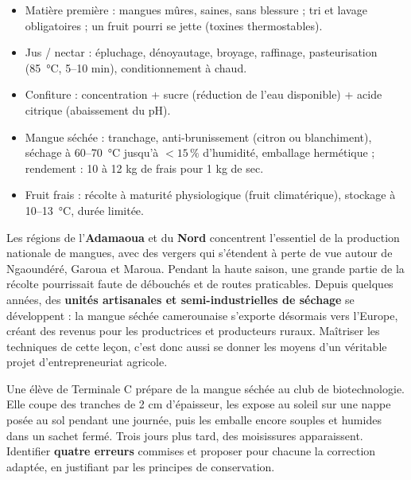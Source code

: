 \documentclass[11pt]{article}
\begin{document}
\begin{aretenir}
\begin{itemize}
\item Matière première : mangues mûres, saines, sans blessure ; tri et lavage obligatoires ; un fruit pourri se jette (toxines thermostables).
\item Jus / nectar : épluchage, dénoyautage, broyage, raffinage, pasteurisation (\SI{85}{\celsius}, 5--10 min), conditionnement à chaud.
\item Confiture : concentration + sucre (réduction de l'eau disponible) + acide citrique (abaissement du pH).
\item Mangue séchée : tranchage, anti-brunissement (citron ou blanchiment), séchage à 60--\SI{70}{\celsius} jusqu'à $< 15\,\%$ d'humidité, emballage hermétique ; rendement : 10 à 12 kg de frais pour 1 kg de sec.
\item Fruit frais : récolte à maturité physiologique (fruit climatérique), stockage à 10--\SI{13}{\celsius}, durée limitée.
\end{itemize}
\end{aretenir}

\begin{savaistu}
Les régions de l'\textbf{Adamaoua} et du \textbf{Nord} concentrent l'essentiel de la production nationale de mangues, avec des vergers qui s'étendent à perte de vue autour de Ngaoundéré, Garoua et Maroua. Pendant la haute saison, une grande partie de la récolte pourrissait faute de débouchés et de routes praticables. Depuis quelques années, des \textbf{unités artisanales et semi-industrielles de séchage} se développent : la mangue séchée camerounaise s'exporte désormais vers l'Europe, créant des revenus pour les productrices et producteurs ruraux. Maîtriser les techniques de cette leçon, c'est donc aussi se donner les moyens d'un véritable projet d'entrepreneuriat agricole.
\end{savaistu}

\begin{exercice}
Une élève de Terminale C prépare de la mangue séchée au club de biotechnologie. Elle coupe des tranches de 2 cm d'épaisseur, les expose au soleil sur une nappe posée au sol pendant une journée, puis les emballe encore souples et humides dans un sachet fermé. Trois jours plus tard, des moisissures apparaissent. Identifier \textbf{quatre erreurs} commises et proposer pour chacune la correction adaptée, en justifiant par les principes de conservation.
\end{exercice}
\end{document}
